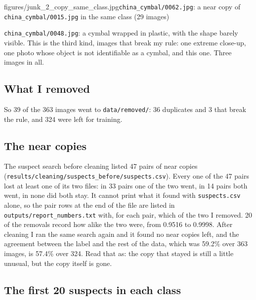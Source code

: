 \documentclass[11pt]{article}
\begin{document}
{figures/junk_2_copy_same_class.jpg}{\texttt{china\_cymbal/0062.jpg}: a near
copy of \texttt{china\_cymbal/0015.jpg} in the same class (29 images)}

\begin{center}\end{center}

\texttt{china\_cymbal/0048.jpg}: a cymbal wrapped in plastic, with the shape
barely visible. This is the third kind, images that break my rule: one extreme
close-up, one photo whose object is not identifiable as a cymbal, and this one.
Three images in all.

\subsection*{What I removed}

So 39 of the 363 images went to \texttt{data/removed/}: 36 duplicates and 3 that
break the rule, and 324 were left for training.

\subsection*{The near copies}

The suspect search before cleaning listed 47 pairs of near copies
(\texttt{results/cleaning/suspects\_before/suspects.csv}). Every one of the 47
pairs lost at least one of its two files: in 33 pairs one of the two went, in 14
pairs both went, in none did both stay. It cannot print what it found with
\texttt{suspects.csv} alone, so the pair rows at the end of the file are listed
in \texttt{outputs/report\_numbers.txt} with, for each pair, which of the two I
removed. 20 of the removals record how alike the two were, from 0.9516 to
0.9998. After cleaning I ran the same search again and it found no near copies
left, and the agreement between the label and the rest of the data, which was
59.2\% over 363 images, is 57.4\% over 324. Read that as: the copy that stayed is
still a little unusual, but the copy itself is gone.


\subsection*{The first 20 suspects in each class}
\end{document}
